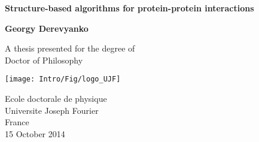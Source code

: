 \begin{titlepage}
    \begin{center}
        \vspace*{1cm}
        
        \Huge
        \textbf{Structure-based algorithms for protein-protein interactions}
        
        \vspace{0.5cm}
        
        \vspace{1.5cm}
        
        \textbf{Georgy Derevyanko}
        
        \vfill
        
        A thesis presented for the degree of\\
        Doctor of Philosophy
        
        \vspace{0.8cm}
        
        \texttt{[image: Intro/Fig/logo\_UJF]}
        
        \Large
        Ecole doctorale de physique\\
        Universite Joseph Fourier\\
        France\\
        15 October 2014
        
    \end{center}
\end{titlepage}
